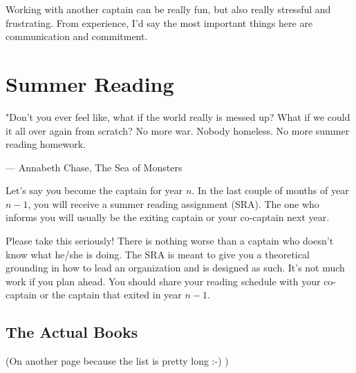 \documentclass[11pt, letterpaper]{article}
\begin{document}
Working with another captain can be really fun, but also really stressful and frustrating.
From experience, I'd say the most important things here are communication and commitment.



\newpage

\section{Summer Reading}
\epigraph{"Don't you ever feel like, what if the world really is messed up? What if we could it all over again from scratch? No more war. Nobody homeless. No more summer reading homework.}{--- \textup{Annabeth Chase}, The Sea of Monsters}

Let's say you become the captain for year $n$.
In the last couple of months of year $n-1$, you will receive a summer reading assignment (SRA).
The one who informs you will usually be the exiting captain or your co-captain next year.

Please take this seriously! 
There is nothing worse than a captain who doesn't know what he/she is doing.
The SRA is meant to give you a theoretical grounding in how to lead an organization and is designed as such.
It's not much work if you plan ahead.
You should share your reading schedule with your co-captain or the captain that exited in year $n-1$.

\newpage
\subsection{The Actual Books}
(On another page because the list is pretty long :-) )
\end{document}
